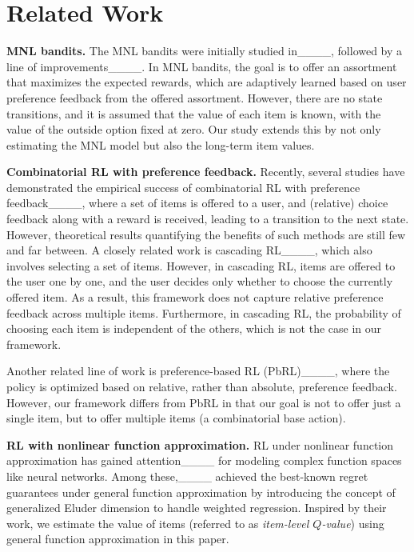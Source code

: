 \section{Related Work}
\label{sec:Related}
%
\textbf{MNL bandits.}
%
The MNL bandits were initially studied in____, followed by a line of improvements____.
In MNL bandits, the goal is to offer an assortment that maximizes the expected rewards, which are adaptively learned based on user preference feedback from the offered assortment.
However, there are no state transitions, and it is assumed that the value of each item is known, with the value of the outside option fixed at zero.
Our study extends this by not only estimating the MNL model but also the long-term item values.

%
\textbf{Combinatorial RL with preference feedback.}
%
Recently, several studies have demonstrated the empirical success of combinatorial RL with preference feedback____, where a set of items is offered to a user, and (relative) choice feedback along with a reward is received, leading to a transition to the next state.
However, theoretical results quantifying the benefits of such methods are still few and far between.
A closely related work is cascading RL____, which also involves selecting a set of items. 
However, in cascading RL, items are offered to the user one by one, and the user decides only whether to choose the currently offered item. 
As a result, this framework does not capture relative preference feedback across multiple items. 
Furthermore, in cascading RL, the probability of choosing each item is independent of the others, which is not the case in our framework.


Another related line of work is preference-based RL (PbRL)____, where the policy is optimized based on relative, rather than absolute, preference feedback. 
However, our framework differs from PbRL in that our goal is not to offer just a single item, but to offer multiple items (a combinatorial base action).


%
\textbf{RL with nonlinear function approximation.}
RL under nonlinear function approximation has gained attention____ for modeling complex function spaces like neural networks.
Among these,____ achieved the best-known regret guarantees under general function approximation by introducing the concept of generalized Eluder dimension to handle weighted regression. 
Inspired by their work, we estimate the value of items (referred to as \textit{item-level $Q$-value}) using general function approximation in this paper.

